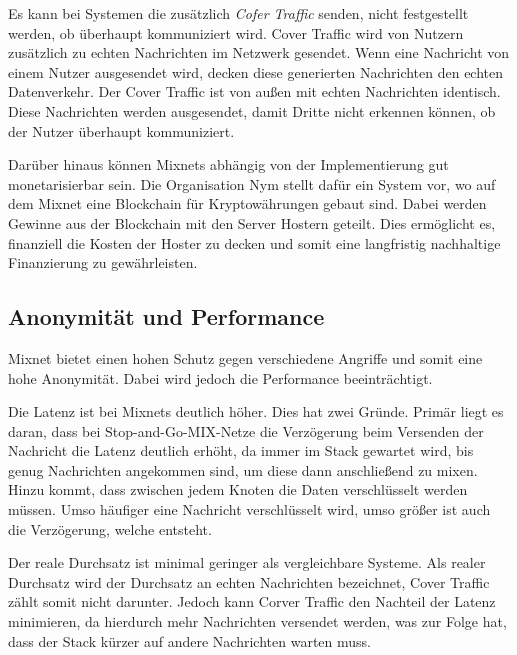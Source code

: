 Es kann bei Systemen die zusätzlich \textit{Cofer Traffic} senden, nicht festgestellt werden, ob überhaupt kommuniziert wird. Cover Traffic wird von Nutzern zusätzlich zu echten Nachrichten im Netzwerk gesendet. Wenn eine Nachricht von einem Nutzer ausgesendet wird, decken diese generierten Nachrichten den echten Datenverkehr. Der Cover Traffic ist von außen mit echten Nachrichten identisch. Diese Nachrichten werden ausgesendet, damit Dritte nicht erkennen können, ob der Nutzer überhaupt kommuniziert\cite{LoopixAnonymitySystem}.

Darüber hinaus können Mixnets abhängig von der Implementierung gut monetarisierbar sein. Die Organisation Nym stellt dafür ein System vor, wo auf dem Mixnet eine Blockchain für Kryptowährungen gebaut sind. Dabei werden Gewinne aus der Blockchain mit den Server Hostern geteilt. Dies ermöglicht es, finanziell die Kosten der Hoster zu decken und somit eine langfristig nachhaltige Finanzierung zu gewährleisten\cite{RewardSharingForMixnets}.

\subsection{Anonymität und Performance}
\label{chap:mixnet_anonymity_performance}

Mixnet bietet einen hohen Schutz gegen verschiedene Angriffe und somit eine hohe Anonymität. Dabei wird jedoch die Performance beeinträchtigt.

Die Latenz ist bei Mixnets deutlich höher. Dies hat zwei Gründe. Primär liegt es daran, dass bei Stop-and-Go-MIX-Netze die Verzögerung beim Versenden der Nachricht die Latenz deutlich erhöht, da immer im Stack gewartet wird, bis genug Nachrichten angekommen sind, um diese dann anschließend zu mixen. Hinzu kommt, dass zwischen jedem Knoten die Daten verschlüsselt werden müssen. Umso häufiger eine Nachricht verschlüsselt wird, umso größer ist auch die Verzögerung, welche entsteht\cite{EffectivenessOfMixnets}.

Der reale Durchsatz ist minimal geringer als vergleichbare Systeme. Als realer Durchsatz wird der Durchsatz an echten Nachrichten bezeichnet, Cover Traffic zählt somit nicht darunter. Jedoch kann Corver Traffic den Nachteil der Latenz minimieren, da hierdurch mehr Nachrichten versendet werden, was zur Folge hat, dass der Stack kürzer auf andere Nachrichten warten muss.
